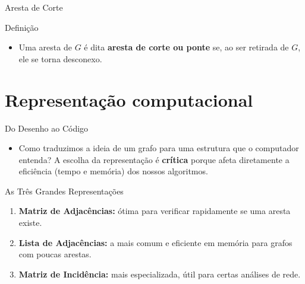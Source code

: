 \documentclass[xcolor=table]{beamer}
\begin{document}
\begin{frame}{Aresta de Corte}
  \begin{block}{Definição}
    \begin{itemize}
      \item Uma aresta de $G$ é dita \textbf{aresta de corte ou ponte} se, ao ser retirada de $G$, ele se torna desconexo.
    \end{itemize}
    \centering
  \end{block}
\end{frame}

\section{Representação computacional}

\begin{frame}{Do Desenho ao Código}
  \begin{itemize}
    \item Como traduzimos a ideia de um grafo para uma estrutura que o computador entenda? A escolha da representação é \textbf{crítica} porque afeta diretamente a eficiência (tempo e memória) dos nossos algoritmos.
  \end{itemize}
  \begin{block}{As Três Grandes Representações}
    \begin{enumerate}
      \item \textbf{Matriz de Adjacências:} ótima para verificar rapidamente se uma aresta existe.
      \item \textbf{Lista de Adjacências:} a mais comum e eficiente em memória para grafos com poucas arestas.
      \item \textbf{Matriz de Incidência:} mais especializada, útil para certas análises de rede.
    \end{enumerate}
  \end{block}
\end{frame}
\end{document}
